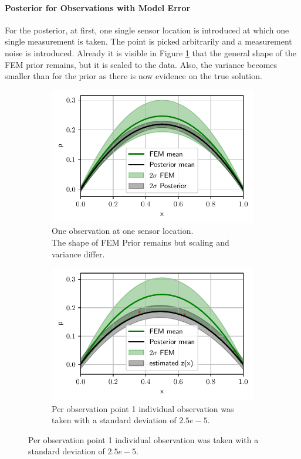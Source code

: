\documentclass[%
  a4paper,oneside,%
  11pt,%
  smallchapters,
  style=printdev,
  extramargin,
  green,%
  rgb, <cmyk>
  ]{tubsbook}
\begin{document}
\paragraph{Posterior for Observations with Model Error}
For the posterior, at first, one single sensor location is introduced at which one single measurement is taken. The point is picked arbitrarily and a measurement noise is introduced. Already it is visible in Figure \ref{fig:ModelError1Da} that the general shape of the FEM prior remains, but it is scaled to the data. Also, the variance becomes smaller than for the prior as there is now evidence on the true solution.
%
\begin{figure}[!ht]

\centering

	\begin{subfigure}[t]{.5\textwidth}
	\centering
	\includegraphics[width=1\linewidth]{../../Python/Results/1D/Model_Error/1o_1s/Result.pdf}
	\caption{One observation at one sensor location.\\
	The shape of FEM Prior remains but scaling and variance differ.}	
	\label{fig:ModelError1Da}
	\end{subfigure}%
	\begin{subfigure}[t]{.5\textwidth}
	\centering
	\includegraphics[width=1\linewidth]{../../Python/Results/1D/Model_Error/1o_4s/Result.pdf}
	\caption{Per observation point 1 individual observation was taken with a standard deviation of $2.5e-5$. }	
	\label{fig:ModelError1Db}
	\end{subfigure}
	

\end{figure}
\end{document}
